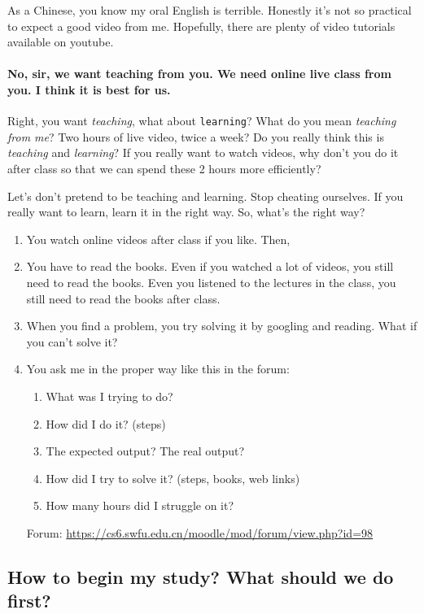 \documentclass{article}
\begin{document}
As a Chinese, you know my oral English is terrible. Honestly it's not so practical to
expect a good video from me. Hopefully, there are plenty of video tutorials available on
youtube.

\paragraph{No, sir, we want teaching from you. We need online live class from you. I think
  it is best for us.}

Right, you want \emph{teaching}, what about \texttt{learning}?  What do you mean
\emph{teaching from me}? Two hours of live video, twice a week? Do you really think this
is \emph{teaching} and \emph{learning}? If you really want to watch videos, why don't you
do it after class so that we can spend these 2 hours more efficiently?

Let's don't pretend to be teaching and learning. Stop cheating ourselves.  If you really
want to learn, learn it in the right way. So, what's the right way?
\begin{enumerate}
\item You watch online videos after class if you like. Then,
\item You have to read the books. Even if you watched a lot of videos, you still need to
  read the books. Even you listened to the lectures in the class, you still need to read
  the books after class.
\item When you find a problem, you try solving it by googling and reading. What if you
  can't solve it?
\item You ask me in the proper way like this in the forum:
  \begin{enumerate}
  \item What was I trying to do?
  \item How did I do it? (steps)
  \item The expected output? The real output?
  \item How did I try to solve it? (steps, books, web links)
  \item How many hours did I struggle on it?
  \end{enumerate}
  Forum: \url{https://cs6.swfu.edu.cn/moodle/mod/forum/view.php?id=98}
\end{enumerate}

\subsection[How to begin?]{How to begin my study? What should we do first?}
\label{sec:begin}
\end{document}
